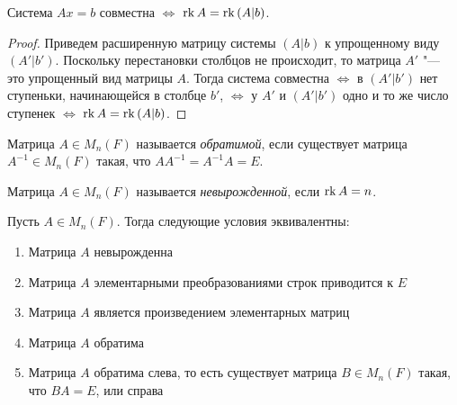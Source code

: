     \begin{theorem}
    	Система $Ax = b$ совместна $\Leftrightarrow$ $\operatorname{rk}{A} = \operatorname{rk}{(A|b)}$.
    \end{theorem}
    
    \begin{proof}
    	Приведем расширенную матрицу системы $(A|b)$ к упрощенному виду $(A'|b')$. Поскольку перестановки столбцов не происходит, то матрица $A'$ "--- это упрощенный вид матрицы $A$. Тогда система совместна $\Leftrightarrow$ в $(A'|b')$ нет ступеньки, начинающейся в столбце $b'$, $\Leftrightarrow$ у $A'$ и $(A'|b')$ одно и то же число ступенек $\Leftrightarrow$ $\operatorname{rk}{A} = \operatorname{rk}{(A|b)}$.
    \end{proof}
    
    \begin{definition}
    	Матрица $A \in M_n(F)$ называется \textit{обратимой}, если существует матрица $A^{-1} \in M_n(F)$ такая, что $AA^{-1} = A^{-1}A = E$.
    \end{definition}
    
    \begin{definition}
    	Матрица $A \in M_{n}(F)$ называется \textit{невырожденной}, если $\operatorname{rk}{A} = n$.
    \end{definition}
    
    \begin{theorem}
    	Пусть $A \in M_{n}(F)$. Тогда следующие условия эквивалентны:
    	\begin{enumerate}
    		\item Матрица $A$ невырожденна
    		\item Матрица $A$ элементарными преобразованиями строк приводится к $E$
    		\item Матрица $A$ является произведением элементарных матриц
    		\item Матрица $A$ обратима
    		\item Матрица $A$ обратима слева, то есть существует матрица $B \in M_n(F)$ такая, что $BA = E$, или справа
    	\end{enumerate}
    \end{theorem}
    

